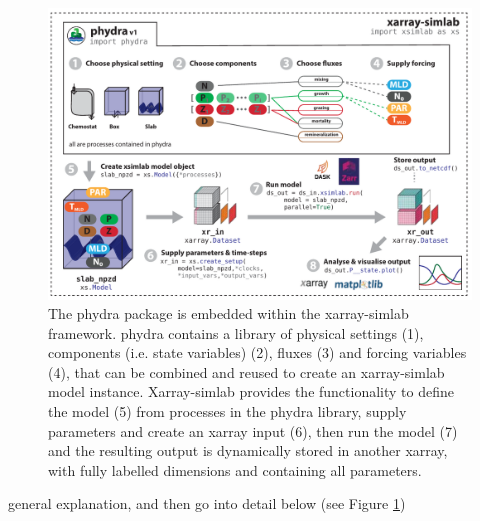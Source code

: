 \documentclass[template.tex]{subfiles}
\begin{document}
%
\begin{figure}[t]
\includegraphics[width=12cm]{Figures/firstdraft_schematics/01__schematics_phydra_1.pdf}
\caption{The phydra package is embedded within the xarray-simlab framework. phydra contains a library of physical settings (1), components (i.e. state variables) (2), fluxes (3) and forcing variables (4), that can be combined and reused to create an xarray-simlab model instance. Xarray-simlab provides the functionality to define the model (5) from processes in the phydra library, supply parameters and create an xarray input (6), then run the model (7) and the resulting output is dynamically stored in another xarray, with fully labelled dimensions and containing all parameters.}
\label{Figure:phydraschematics}
\end{figure}

general explanation, and then go into detail below (see Figure \ref{Figure:phydraschematics})





\biblio
\end{document}
